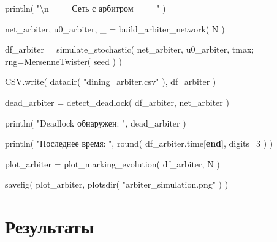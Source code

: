 \documentclass[
  english,
  russian,
  12pt,
  a4paper,
  DIV=11,
  numbers=noendperiod]{scrreprt}
\newenvironment{Shaded}{\begin{snugshade}}{\end{snugshade}}
\newcommand{\FloatTok}[1]{\textcolor[rgb]{0.68,0.00,0.00}{#1}}
\newcommand{\FunctionTok}[1]{\textcolor[rgb]{0.28,0.35,0.67}{#1}}
\newcommand{\KeywordTok}[1]{\textcolor[rgb]{0.00,0.23,0.31}{\textbf{#1}}}
\newcommand{\NormalTok}[1]{\textcolor[rgb]{0.00,0.23,0.31}{#1}}
\newcommand{\OperatorTok}[1]{\textcolor[rgb]{0.37,0.37,0.37}{#1}}
\newcommand{\SpecialCharTok}[1]{\textcolor[rgb]{0.37,0.37,0.37}{#1}}
\newcommand{\StringTok}[1]{\textcolor[rgb]{0.13,0.47,0.30}{#1}}
\begin{document}
\begin{Shaded}
\begin{Highlighting}[]
\FunctionTok{println}\NormalTok{(}
    \StringTok{"}\SpecialCharTok{\textbackslash{}n}\StringTok{=== Сеть с арбитром ==="}
\NormalTok{)}

\NormalTok{net\_arbiter,}
\NormalTok{u0\_arbiter,}
\NormalTok{\_ }\OperatorTok{=}
    \FunctionTok{build\_arbiter\_network}\NormalTok{(}
\NormalTok{        N}
\NormalTok{    )}

\NormalTok{df\_arbiter }\OperatorTok{=}
    \FunctionTok{simulate\_stochastic}\NormalTok{(}
\NormalTok{        net\_arbiter,}
\NormalTok{        u0\_arbiter,}
\NormalTok{        tmax;}
\NormalTok{        rng}\OperatorTok{=}\FunctionTok{MersenneTwister}\NormalTok{(}
\NormalTok{            seed}
\NormalTok{        )}
\NormalTok{    )}

\NormalTok{CSV.}\FunctionTok{write}\NormalTok{(}
    \FunctionTok{datadir}\NormalTok{(}
        \StringTok{"dining\_arbiter.csv"}
\NormalTok{    ),}
\NormalTok{    df\_arbiter}
\NormalTok{)}

\NormalTok{dead\_arbiter }\OperatorTok{=}
    \FunctionTok{detect\_deadlock}\NormalTok{(}
\NormalTok{        df\_arbiter,}
\NormalTok{        net\_arbiter}
\NormalTok{    )}

\FunctionTok{println}\NormalTok{(}
    \StringTok{"Deadlock обнаружен: "}\NormalTok{,}
\NormalTok{    dead\_arbiter}
\NormalTok{)}

\FunctionTok{println}\NormalTok{(}
    \StringTok{"Последнее время: "}\NormalTok{,}
    \FunctionTok{round}\NormalTok{(}
\NormalTok{        df\_arbiter.time[}\KeywordTok{end}\NormalTok{],}
\NormalTok{        digits}\OperatorTok{=}\FloatTok{3}
\NormalTok{    )}
\NormalTok{)}

\NormalTok{plot\_arbiter }\OperatorTok{=}
    \FunctionTok{plot\_marking\_evolution}\NormalTok{(}
\NormalTok{        df\_arbiter,}
\NormalTok{        N}
\NormalTok{    )}

\FunctionTok{savefig}\NormalTok{(}
\NormalTok{    plot\_arbiter,}
    \FunctionTok{plotsdir}\NormalTok{(}
        \StringTok{"arbiter\_simulation.png"}
\NormalTok{    )}
\NormalTok{)}
\end{Highlighting}
\end{Shaded}

\section{Результаты}\label{ux440ux435ux437ux443ux43bux44cux442ux430ux442ux44b}
\end{document}
